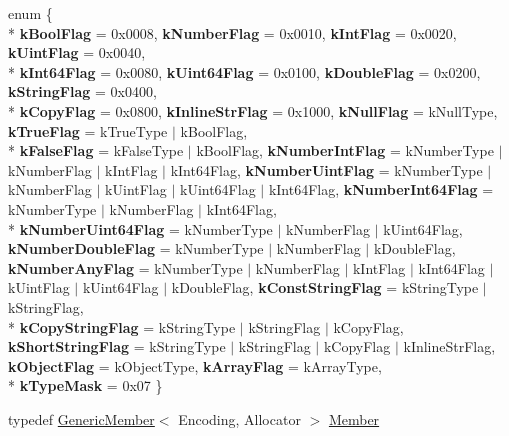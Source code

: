 \begin{DoxyCompactItemize}
\item 
enum \{ \\*
{\bfseries k\+Bool\+Flag} = 0x0008, 
{\bfseries k\+Number\+Flag} = 0x0010, 
{\bfseries k\+Int\+Flag} = 0x0020, 
{\bfseries k\+Uint\+Flag} = 0x0040, 
\\*
{\bfseries k\+Int64\+Flag} = 0x0080, 
{\bfseries k\+Uint64\+Flag} = 0x0100, 
{\bfseries k\+Double\+Flag} = 0x0200, 
{\bfseries k\+String\+Flag} = 0x0400, 
\\*
{\bfseries k\+Copy\+Flag} = 0x0800, 
{\bfseries k\+Inline\+Str\+Flag} = 0x1000, 
{\bfseries k\+Null\+Flag} = k\+Null\+Type, 
{\bfseries k\+True\+Flag} = k\+True\+Type $\vert$ k\+Bool\+Flag, 
\\*
{\bfseries k\+False\+Flag} = k\+False\+Type $\vert$ k\+Bool\+Flag, 
{\bfseries k\+Number\+Int\+Flag} = k\+Number\+Type $\vert$ k\+Number\+Flag $\vert$ k\+Int\+Flag $\vert$ k\+Int64\+Flag, 
{\bfseries k\+Number\+Uint\+Flag} = k\+Number\+Type $\vert$ k\+Number\+Flag $\vert$ k\+Uint\+Flag $\vert$ k\+Uint64\+Flag $\vert$ k\+Int64\+Flag, 
{\bfseries k\+Number\+Int64\+Flag} = k\+Number\+Type $\vert$ k\+Number\+Flag $\vert$ k\+Int64\+Flag, 
\\*
{\bfseries k\+Number\+Uint64\+Flag} = k\+Number\+Type $\vert$ k\+Number\+Flag $\vert$ k\+Uint64\+Flag, 
{\bfseries k\+Number\+Double\+Flag} = k\+Number\+Type $\vert$ k\+Number\+Flag $\vert$ k\+Double\+Flag, 
{\bfseries k\+Number\+Any\+Flag} = k\+Number\+Type $\vert$ k\+Number\+Flag $\vert$ k\+Int\+Flag $\vert$ k\+Int64\+Flag $\vert$ k\+Uint\+Flag $\vert$ k\+Uint64\+Flag $\vert$ k\+Double\+Flag, 
{\bfseries k\+Const\+String\+Flag} = k\+String\+Type $\vert$ k\+String\+Flag, 
\\*
{\bfseries k\+Copy\+String\+Flag} = k\+String\+Type $\vert$ k\+String\+Flag $\vert$ k\+Copy\+Flag, 
{\bfseries k\+Short\+String\+Flag} = k\+String\+Type $\vert$ k\+String\+Flag $\vert$ k\+Copy\+Flag $\vert$ k\+Inline\+Str\+Flag, 
{\bfseries k\+Object\+Flag} = k\+Object\+Type, 
{\bfseries k\+Array\+Flag} = k\+Array\+Type, 
\\*
{\bfseries k\+Type\+Mask} = 0x07
 \}\hypertarget{class_generic_value_a8ac062f7dd04f16f0e0013218ea1aa94}{}\label{class_generic_value_a8ac062f7dd04f16f0e0013218ea1aa94}

\item 
typedef \hyperlink{struct_generic_member}{Generic\+Member}$<$ Encoding, Allocator $>$ \hyperlink{class_generic_value_a7ccf27c44058b4c11c3efc6473afb886}{Member}\hypertarget{class_generic_value_a7ccf27c44058b4c11c3efc6473afb886}{}\label{class_generic_value_a7ccf27c44058b4c11c3efc6473afb886}


\end{DoxyCompactItemize}
